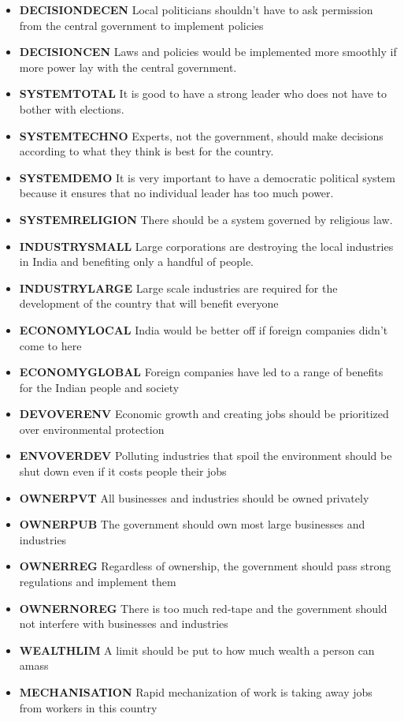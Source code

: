 \documentclass[
]{article}
\providecommand{\tightlist}{%
  \setlength{\itemsep}{0pt}\setlength{\parskip}{0pt}}
\begin{document}
\begin{itemize}
\tightlist
\item
  \textbf{DECISIONDECEN} Local politicians shouldn't have to ask
  permission from the central government to implement policies
\item
  \textbf{DECISIONCEN} Laws and policies would be implemented more
  smoothly if more power lay with the central government.
\item
  \textbf{SYSTEMTOTAL} It is good to have a strong leader who does not
  have to bother with elections.
\item
  \textbf{SYSTEMTECHNO} Experts, not the government, should make
  decisions according to what they think is best for the country.
\item
  \textbf{SYSTEMDEMO} It is very important to have a democratic
  political system because it ensures that no individual leader has too
  much power.
\item
  \textbf{SYSTEMRELIGION} There should be a system governed by religious
  law.
\item
  \textbf{INDUSTRYSMALL} Large corporations are destroying the local
  industries in India and benefiting only a handful of people.
\item
  \textbf{INDUSTRYLARGE} Large scale industries are required for the
  development of the country that will benefit everyone
\item
  \textbf{ECONOMYLOCAL} India would be better off if foreign companies
  didn't come to here
\item
  \textbf{ECONOMYGLOBAL} Foreign companies have led to a range of
  benefits for the Indian people and society
\item
  \textbf{DEVOVERENV} Economic growth and creating jobs should be
  prioritized over environmental protection
\item
  \textbf{ENVOVERDEV} Polluting industries that spoil the environment
  should be shut down even if it costs people their jobs
\item
  \textbf{OWNERPVT} All businesses and industries should be owned
  privately
\item
  \textbf{OWNERPUB} The government should own most large businesses and
  industries
\item
  \textbf{OWNERREG} Regardless of ownership, the government should pass
  strong regulations and implement them
\item
  \textbf{OWNERNOREG} There is too much red-tape and the government
  should not interfere with businesses and industries
\item
  \textbf{WEALTHLIM} A limit should be put to how much wealth a person
  can amass
\item
  \textbf{MECHANISATION} Rapid mechanization of work is taking away jobs
  from workers in this country
\end{itemize}
\end{document}
